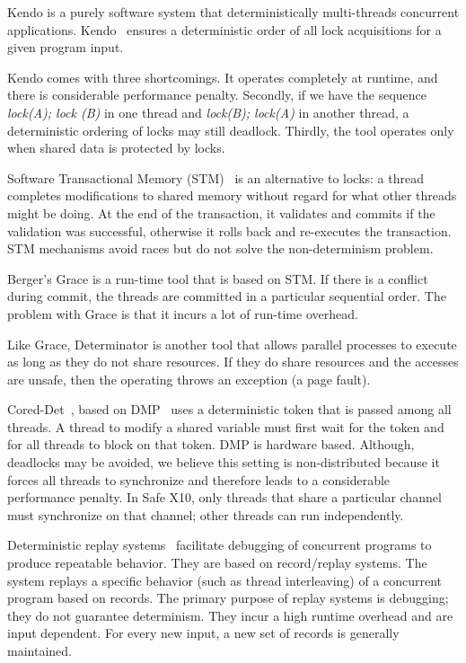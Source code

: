 Kendo is a purely software system that deterministically multi-threads
concurrent applications.  Kendo~\cite{olszewski2009kendo} ensures a
deterministic order of all lock acquisitions for a given program
input.

Kendo comes with three shortcomings. It operates completely at runtime,
and there is considerable performance penalty. Secondly, if
we have the sequence \emph{lock(A); lock (B)} in one thread and
\emph{lock(B); lock(A)} in another thread, a deterministic ordering of
locks may still deadlock. Thirdly, the tool operates only when
shared data is protected by locks.

Software Transactional Memory (STM)~\cite{shavit1995software}
  is an alternative to locks: a thread completes modifications to
shared memory without regard for what other threads might be doing. At the end of the transaction,
it validates and commits if the validation was successful, otherwise it rolls back and re-executes
the transaction. STM mechanisms avoid races but do not solve the non-determinism problem.

Berger's Grace\cite{berger2009grace} is a run-time tool
that is based on STM.
If there is a conflict during commit, the threads are committed in
a particular sequential order.
The problem with Grace is that it incurs a lot of run-time
overhead.

Like Grace, Determinator\cite{aviram2010efficient} is another tool
that allows parallel processes to execute as long as they do not share
resources. If they do share resources and the accesses are unsafe, then
the operating throws an exception (a page fault).

Cored-Det~\cite{bergan2010coreDet}, based on DMP~\cite{devietti2009dmp}
uses a deterministic token that is passed
among all threads.  A thread to modify a shared variable must first
wait for the token and for all threads to block on that
token. DMP is hardware based.
Although, deadlocks may be avoided, we believe this setting is
non-distributed because it forces all threads to synchronize and
therefore leads to a considerable performance penalty. In Safe X10,
only threads that share a particular channel must synchronize
on that channel; other threads can run independently.

 Deterministic replay systems~\cite{choi1998deterministic,altekar2009odr} facilitate debugging of concurrent programs to produce
repeatable behavior. They are based on record/replay systems. The system
replays a specific behavior (such as thread interleaving) of a concurrent
program based on records. The primary purpose of replay systems
is debugging; they do not guarantee determinism.
They incur a high runtime overhead and are input dependent.
For every new input, a new set of records is generally maintained.

